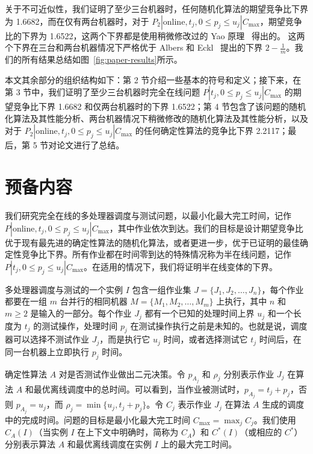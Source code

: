 关于不可近似性，我们证明了至少三台机器时，任何随机化算法的期望竞争比下界为 1.6682，而在仅有两台机器时，对于 \( P_2 | \text{online}, t_j, 0 \leq p_j \leq u_j | C_{\text{max}} \)，期望竞争比的下界为 1.6522，这两个下界都是使用稍微修改过的 Yao 原理~\cite{yao1977probabilistic} 得出的。
这两个下界在三台和两台机器情况下严格优于 Albers 和 Eckl~\cite{albers2021scheduling} 提出的下界 \( 2 - \frac{1}{m} \)。我们的所有结果总结如图~\ref{fig:paper-results}所示。

本文其余部分的组织结构如下：第 2 节介绍一些基本的符号和定义；接下来，在第 3 节中，我们证明了至少三台机器时完全在线问题 \( P | t_j, 0 \leq p_j \leq u_j | C_{\text{max}} \) 的期望竞争比下界 1.6682 和仅两台机器时的下界 1.6522；第 4 节包含了该问题的随机化算法及其性能分析、两台机器情况下稍微修改的随机化算法及其性能分析，以及对于 \( P_2 | \text{online}, t_j, 0 \leq p_j \leq u_j | C_{\text{max}} \) 的任何确定性算法的竞争比下界 2.2117；最后，第 5 节对论文进行了总结。

\section{预备内容}

我们研究完全在线的多处理器调度与测试问题，以最小化最大完工时间，记作 \( P | \text{online}, t_j, 0 \leq p_j \leq u_j | C_{\text{max}} \)，其中作业依次到达。我们的目标是设计期望竞争比优于现有最先进的确定性算法的随机化算法，或者更进一步，优于已证明的最佳确定性竞争比下界。所有作业都在时间零到达的特殊情况称为半在线问题，记作 \( P | t_j , 0 \leq p_j \leq u_j | C_{\text{max}} \)。在适用的情况下，我们将证明半在线变体的下界。

多处理器调度与测试的一个实例 \( I \) 包含一组作业集 \( J = \{J_1, J_2, \dots, J_n\} \)，每个作业都要在一组 \( m \) 台并行的相同机器 \( M = \{M_1, M_2, \dots, M_m\} \) 上执行，其中 \( n \) 和 \( m \geq 2 \) 是输入的一部分。每个作业 \( J_j \) 都有一个已知的处理时间上界 \( u_j \) 和一个长度为 \( t_j \) 的测试操作，处理时间 \( p_j \) 在测试操作执行之前是未知的。也就是说，调度器可以选择不测试作业 \( J_j \)，而是执行它 \( u_j \) 时间，或者选择测试它 \( t_j \) 时间后，在同一台机器上立即执行 \( p_j \) 时间。

确定性算法 \( A \) 对是否测试作业做出二元决策。令 \( p_{A_j} \) 和 \( \rho_j \) 分别表示作业 \( J_j \) 在算法 \( A \) 和最优离线调度中的总时间。可以看到，当作业被测试时，\( p_{A_j} = t_j + p_j \)，否则 \( p_{A_j} = u_j \)，而 \( \rho_j = \min\{u_j, t_j + p_j\} \)。令 \( C_j \) 表示作业 \( J_j \) 在算法 \( A \) 生成的调度中的完成时间。问题的目标是最小化最大完工时间 \( C_{\text{max}} = \max_j C_j \)。我们使用 \( C_A(I) \)（当实例 \( I \) 在上下文中明确时，简称为 \( C_A \)）和 \( C^*(I) \)（或相应的 \( C^* \)）分别表示算法 \( A \) 和最优离线调度在实例 \( I \) 上的最大完工时间。

